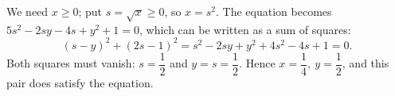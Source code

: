 We need $x\ge0$; put $s=\sqrt x\ge0$, so $x=s^2$. The equation becomes $5s^2-2sy-4s+y^2+1=0$, which can be written as a sum of squares:
\[(s-y)^2+(2s-1)^2=s^2-2sy+y^2+4s^2-4s+1=0.\]
Both squares must vanish: $s=\dfrac{1}{2}$ and $y=s=\dfrac{1}{2}$. Hence $\boxed{x=\dfrac{1}{4},\ y=\dfrac{1}{2}}$, and this pair does satisfy the equation.
